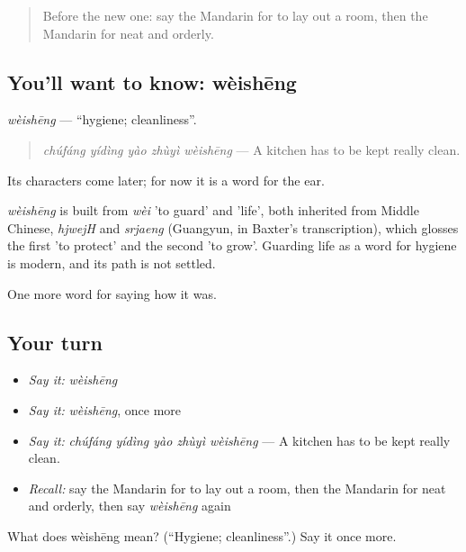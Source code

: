 \begin{quote}
Before the new one: say the Mandarin for to lay out a room, then the Mandarin for neat and orderly.
\end{quote}

\subsection*{You'll want to know: wèishēng}
\emph{wèishēng} — \textquotedblleft{}hygiene; cleanliness\textquotedblright{}.

\begin{quote}
\emph{chúfáng yídìng yào zhùyì wèishēng} — A kitchen has to be kept really clean.
\end{quote}

Its characters come later; for now it is a word for the ear.

\begin{cousinweb}
\emph{wèishēng} is built from \emph{wèi} 'to guard' and  'life', both inherited from Middle Chinese, \emph{hjwejH} and \emph{srjaeng} (Guangyun, in Baxter's transcription), which glosses the first 'to protect' and the second 'to grow'. Guarding life as a word for hygiene is modern, and its path is not settled.
\end{cousinweb}

\begin{grammarlens}[title={What you've built}]
One more word for saying how it was.
\end{grammarlens}

\subsection*{Your turn}
\begin{itemize}
\raggedright
  \item \emph{Say it:} \emph{wèishēng}
  \item \emph{Say it:} \emph{wèishēng}, once more
  \item \emph{Say it:} \emph{chúfáng yídìng yào zhùyì wèishēng} — A kitchen has to be kept really clean.
  \item \emph{Recall:} say the Mandarin for to lay out a room, then the Mandarin for neat and orderly, then say \emph{wèishēng} again
\end{itemize}

\begin{tcolorbox}[breakable,colback=teal!4,colframe=teal!35!black,title={Before you move on}]
What does wèishēng mean? (\textquotedblleft{}Hygiene; cleanliness\textquotedblright{}.) Say it once more.
\end{tcolorbox}
